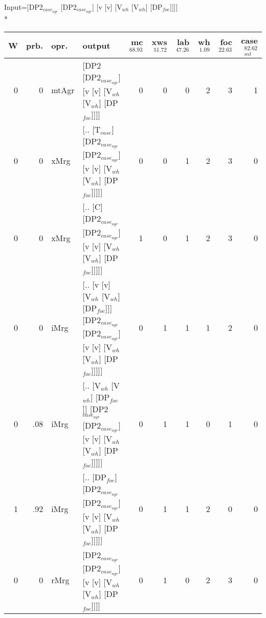 \begingroup\scriptsize Input=[DP2$_{case_{agr}}$ [DP2$_{case_{agr}}$] [v [v] [V$_{wh}$ [V$_{wh}$] [DP$_{foc}$]]]]\\*
\begin{tabularx}{\linewidth}{rrlXrrrrrr}
\hline
   W &   prb. & opr.    & output                                                                                           &   mc$^{68.93}$ &   xws$^{51.72}$ &   lab$^{47.26}$ &   wh$^{1.09}$ &   foc$^{22.63}$ &   case$_{mt}^{82.62}$ \\
\hline
   0 &   0 & mtAgr & [DP2 [DP2$_{case_{agr}}$] [v [v] [V$_{wh}$ [V$_{wh}$] [DP$_{foc}$]]]]                                              &            0 &             0 &             0 &            2 &             3 &                 1 \\
   0 &   0 & xMrg  & [.. [T$_{case}$] [DP2$_{case_{agr}}$ [DP2$_{case_{agr}}$] [v [v] [V$_{wh}$ [V$_{wh}$] [DP$_{foc}$]]]]]                       &            0 &             0 &             1 &            2 &             3 &                 0 \\
   0 &   0 & xMrg  & [.. [C] [DP2$_{case_{agr}}$ [DP2$_{case_{agr}}$] [v [v] [V$_{wh}$ [V$_{wh}$] [DP$_{foc}$]]]]]                            &            1 &             0 &             1 &            2 &             3 &                 0 \\
   0 &   0 & iMrg  & [.. [v [v] [V$_{wh}$ [V$_{wh}$] [DP$_{foc}$]]] [DP2$_{case_{agr}}$ [DP2$_{case_{agr}}$] [v [v] [V$_{wh}$ [V$_{wh}$] [DP$_{foc}$]]]]] &            0 &             1 &             1 &            1 &             2 &                 0 \\
   0 &   .08 & iMrg  & [.. [V$_{wh}$ [V$_{wh}$] [DP$_{foc}$]] [DP2$_{case_{agr}}$ [DP2$_{case_{agr}}$] [v [v] [V$_{wh}$ [V$_{wh}$] [DP$_{foc}$]]]]]         &            0 &             1 &             1 &            0 &             1 &                 0 \\
   1 &   .92 & iMrg  & [.. [DP$_{foc}$] [DP2$_{case_{agr}}$ [DP2$_{case_{agr}}$] [v [v] [V$_{wh}$ [V$_{wh}$] [DP$_{foc}$]]]]]                       &            0 &             1 &             1 &            2 &             0 &                 0 \\
   0 &   0 & rMrg  & [DP2$_{case_{agr}}$ [DP2$_{case_{agr}}$] [v [v] [V$_{wh}$ [V$_{wh}$] [DP$_{foc}$]]]]                                     &            0 &             1 &             0 &            2 &             3 &                 0 \\
\hline
\end{tabularx}\endgroup\\
